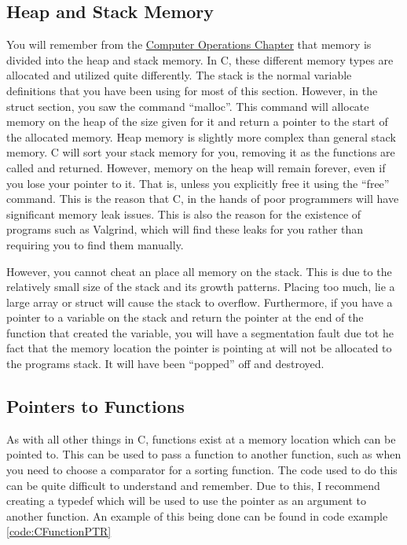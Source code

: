 			\begin{code}
				C}]{./CStructs.c}
				\caption{Example of a C Struct}
				\label{code:CStructs}
			\end{code}
		\subsection{Heap and Stack Memory}
			You will remember from the \hyperref[ch:ComputerOperations]{Computer Operations Chapter} that memory is divided into the heap and stack memory. 
			In C, these different memory types are allocated and utilized quite differently. 
			The stack is the normal variable definitions that you have been using for most of this section. 
			However, in the struct section, you saw the command ``malloc''. 
			This command will allocate memory on the heap of the size given for it and return a pointer to the start of the allocated memory. 
			Heap memory is slightly more complex than general stack memory. 
			C will sort your stack memory for you, removing it as the functions are called and returned. 
			However, memory on the heap will remain forever, even if you lose your pointer to it. 
			That is, unless you explicitly free it using the ``free'' command. 
			This is the reason that C, in the hands of poor programmers will have significant memory leak issues. 
			This is also the reason for the existence of programs such as Valgrind, which will find these leaks for you rather than requiring you to find them manually. 
			
			However, you cannot cheat an place all memory on the stack. 
			This is due to the relatively small size of the stack and its growth patterns. 
			Placing too much, lie a large array or struct will cause the stack to overflow. 
			Furthermore, if you have a pointer to a variable on the stack and return the pointer at the end of the function that created the variable, 
			you will have a segmentation fault due tot he fact that the memory location the pointer is pointing at will not be allocated to the programs stack. 
			It will have been ``popped'' off and destroyed. 

		\subsection{Pointers to Functions}
			As with all other things in C, functions exist at a memory location which can be pointed to. 
			This can be used to pass a function to another function, such as when you need to choose a comparator for a sorting function. 
			The code used to do this can be quite difficult to understand and remember. 
			Due to this, I recommend creating a typedef which will be used to use the pointer as an argument to another function. 
			An example of this being done can be found in code example \ref{code:CFunctionPTR}	
			\begin{code}
				C}]{./CFunctionPTR.c}
				\caption{Example of a C Function Pointers}
				\label{code:CFunctionPTR}
			\end{code}
